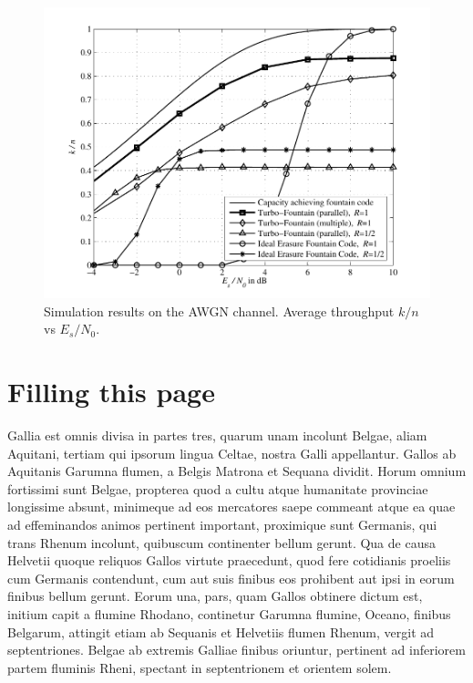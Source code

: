 \documentclass[journal, a4paper]{IEEEtran}
\begin{document}

    \begin{figure}[!hbt]
        \begin{center}
        \includegraphics[width=\columnwidth]{plot_tf}
        \caption{Simulation results on the AWGN channel. Average throughput $k/n$ vs $E_s/N_0$.}
        \label{fig:tf_plot}
        \end{center}
    \end{figure}

\section{Filling this page}
    Gallia est omnis divisa in partes tres, quarum unam incolunt Belgae, aliam Aquitani, tertiam qui ipsorum lingua Celtae, nostra Galli appellantur. Gallos ab Aquitanis Garumna flumen, a Belgis Matrona et Sequana dividit. Horum omnium fortissimi sunt Belgae, propterea quod a cultu atque humanitate provinciae longissime absunt, minimeque ad eos mercatores saepe commeant atque ea quae ad effeminandos animos pertinent important, proximique sunt Germanis, qui trans Rhenum incolunt, quibuscum continenter bellum gerunt. Qua de causa Helvetii quoque reliquos Gallos virtute praecedunt, quod fere cotidianis proeliis cum Germanis contendunt, cum aut suis finibus eos prohibent aut ipsi in eorum finibus bellum gerunt. Eorum una, pars, quam Gallos obtinere dictum est, initium capit a flumine Rhodano, continetur Garumna flumine, Oceano, finibus Belgarum, attingit etiam ab Sequanis et Helvetiis flumen Rhenum, vergit ad septentriones. Belgae ab extremis Galliae finibus oriuntur, pertinent ad inferiorem partem fluminis Rheni, spectant in septentrionem et orientem solem.
\end{document}
